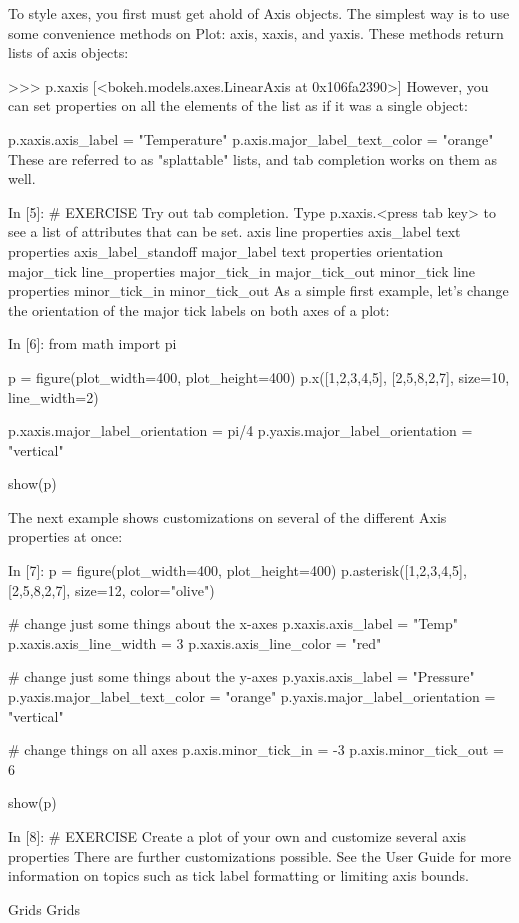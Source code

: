 To style axes, you first must get ahold of Axis objects. The simplest way is to use some convenience methods on Plot: axis, xaxis, and yaxis. These methods return lists of axis objects:

>>> p.xaxis
[<bokeh.models.axes.LinearAxis at 0x106fa2390>]
However, you can set properties on all the elements of the list as if it was a single object:

p.xaxis.axis_label = "Temperature"
p.axis.major_label_text_color = "orange"
These are referred to as "splattable" lists, and tab completion works on them as well.

In [5]:
# EXERCISE Try out tab completion. Type p.xaxis.<press tab key> to see a list of attributes that can be set.
axis
line properties
axis_label
text properties
axis_label_standoff
major_label
text properties
orientation
major_tick
line_properties
major_tick_in
major_tick_out
minor_tick
line properties
minor_tick_in
minor_tick_out
As a simple first example, let's change the orientation of the major tick labels on both axes of a plot:

In [6]:
from math import pi

p = figure(plot_width=400, plot_height=400)
p.x([1,2,3,4,5], [2,5,8,2,7], size=10, line_width=2)

p.xaxis.major_label_orientation = pi/4
p.yaxis.major_label_orientation = "vertical"

show(p)
	
The next example shows customizations on several of the different Axis properties at once:

In [7]:
p = figure(plot_width=400, plot_height=400)
p.asterisk([1,2,3,4,5], [2,5,8,2,7], size=12, color="olive")

# change just some things about the x-axes
p.xaxis.axis_label = "Temp"
p.xaxis.axis_line_width = 3
p.xaxis.axis_line_color = "red"

# change just some things about the y-axes
p.yaxis.axis_label = "Pressure"
p.yaxis.major_label_text_color = "orange"
p.yaxis.major_label_orientation = "vertical"

# change things on all axes
p.axis.minor_tick_in = -3
p.axis.minor_tick_out = 6

show(p)
	
In [8]:
# EXERCISE Create a plot of your own and customize several axis properties
There are further customizations possible. See the User Guide for more information on topics such as tick label formatting or limiting axis bounds.

Grids
Grids


